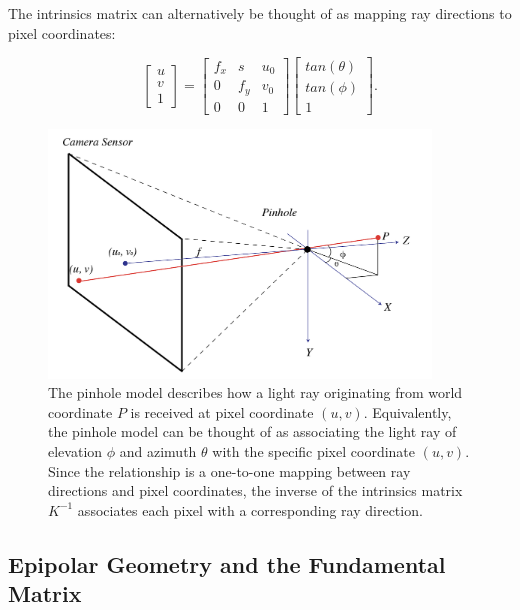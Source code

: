 The intrinsics matrix can alternatively be thought of as mapping ray directions to pixel coordinates:

\begin{equation}
\begin{bmatrix}
    u\\
    v\\
    1
\end{bmatrix} = 
\begin{bmatrix}
    f_x & s & u_0 \\ 
    0 & f_y  & v_0 \\ 
    0 & 0 & 1 
\end{bmatrix}
\begin{bmatrix}
    tan(\theta) \\
    tan(\phi) \\
    1
\end{bmatrix}.
\end{equation}


\begin{figure}[htbp]
    \centering 
    \includegraphics[width=4in]{images/pinhole.png}
    \caption[The pinhole model of the camera]{The pinhole model describes how a light ray originating from world coordinate $P$ is received at pixel coordinate $(u, v)$. Equivalently, the pinhole model can be thought of as associating the light ray of elevation $\phi$ and azimuth $\theta$ with the specific pixel coordinate $(u, v)$. Since the relationship is a one-to-one mapping between ray directions and pixel coordinates, the inverse of the intrinsics matrix $K^{-1}$ associates each pixel with a corresponding ray direction.}
\end{figure}



\subsection{Epipolar Geometry and the Fundamental Matrix}

